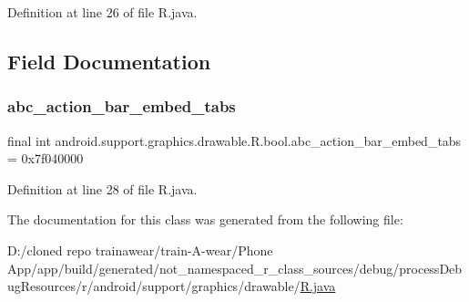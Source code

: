 Definition at line 26 of file R.\+java.


\begin{DoxyCode}{0}

\end{DoxyCode}


\subsection{Field Documentation}
\mbox{\label{classandroid_1_1support_1_1graphics_1_1drawable_1_1_r_1_1bool_a7458f074ec76e2f07e8e86a776e918a4}} 
\subsubsection{\texorpdfstring{abc\_action\_bar\_embed\_tabs}{abc\_action\_bar\_embed\_tabs}}
{\footnotesize\ttfamily final int android.\+support.\+graphics.\+drawable.\+R.\+bool.\+abc\+\_\+action\+\_\+bar\+\_\+embed\+\_\+tabs = 0x7f040000\hspace{0.3cm}{\ttfamily [static]}}



Definition at line 28 of file R.\+java.



The documentation for this class was generated from the following file\+:\begin{DoxyCompactItemize}
\item 
D\+:/cloned repo trainawear/train-\/\+A-\/wear/\+Phone App/app/build/generated/not\+\_\+namespaced\+\_\+r\+\_\+class\+\_\+sources/debug/process\+Debug\+Resources/r/android/support/graphics/drawable/\mbox{\hyperlink{process_debug_resources_2r_2android_2support_2graphics_2drawable_2_r_8java}{R.\+java}}\end{DoxyCompactItemize}
